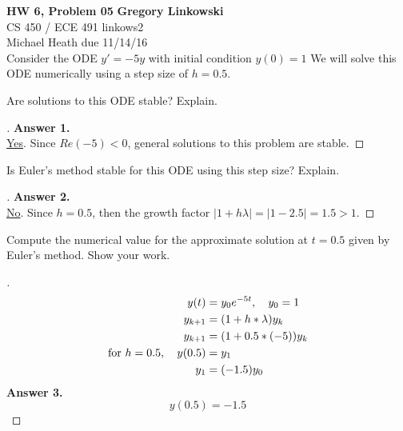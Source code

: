 \documentclass[12pt]{article}
\newenvironment{exercise}[2][Exercise]{\begin{trivlist}
\item[\hskip \labelsep {\bfseries #1}\hskip \labelsep {\bfseries #2.}]}{\end{trivlist}}
\begin{document}
\noindent
\large\textbf{HW 6, Problem 05} \hfill \textbf{Gregory Linkowski} \\
\normalsize CS 450 / ECE 491 \hfill linkows2 \\
Michael Heath \hfill due 11/14/16 \\


\vspace{5mm}
Consider the ODE $y′= -5y$ with initial condition $y(0)=1$ We will solve this ODE numerically using a step size of $h=0.5$.
\vspace{-2mm} \\

\vspace{10mm}
\begin{exercise}{1}
	Are solutions to this ODE stable? Explain.
\end{exercise} %
\begin{proof}[] \vspace{-2mm}
	\textbf{Answer 1.} \\ %
	\underline{Yes}. Since $Re(-5) < 0$, general solutions to this problem are stable.
\end{proof}

\vspace{10mm}
\begin{exercise}{2}
	Is Euler's method stable for this ODE using this step size? Explain.
\end{exercise} 
\begin{proof}[] \vspace{-2mm}
	\textbf{Answer 2.} \\ %
	\underline{No}. Since $h=0.5$, then the growth factor $|1 + h \lambda | = |1 - 2.5| = 1.5 > 1$. 
\end{proof}

\vspace{10mm}
\begin{exercise}{3}
	Compute the numerical value for the approximate solution at $t=0.5$ given by Euler's method. Show your work.
\end{exercise} 
\begin{proof}[] \vspace{-2mm}
	\begin{align*}
		y(t) &= y_0 e^{-5t}, \quad y_0 = 1 \\
		y_{k+1} &= (1 + h * \lambda) y_k \\
		y_{k+1} &= (1 + 0.5 * (-5)) y_k \\
		\textnormal{for } h = 0.5, \quad y(0.5) &= y_1 \\
		y_1 &= (-1.5) y_0
	\end{align*}
	\textbf{Answer 3.}  \vspace{-7mm} \\
	\[ \boxed{ y(0.5) = -1.5 } \]
\end{proof}
\end{document}
